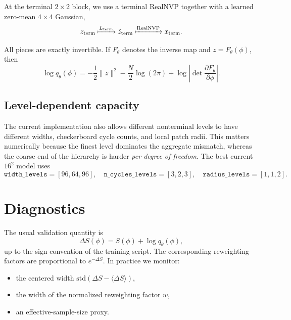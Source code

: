 \documentclass[aps,prd,preprint,nofootinbib,superscriptaddress,longbibliography]{revtex4-2}
\newcommand{\std}{\mathrm{std}}
\begin{document}
At the terminal $2\times2$ block, we use a terminal RealNVP together with a
learned zero-mean $4\times4$ Gaussian,
\begin{equation}
z_{\mathrm{term}}
\xmapsto{L_{\mathrm{term}}}
\tilde z_{\mathrm{term}}
\xmapsto{\mathrm{RealNVP}}
x_{\mathrm{term}}.
\end{equation}

All pieces are exactly invertible. If $F_\theta$ denotes the inverse map and
$z=F_\theta(\phi)$, then
\begin{equation}
\log q_\theta(\phi)
=
-\frac12 \|z\|^2
-\frac{N}{2}\log(2\pi)
+ \log\left|\det\frac{\partial F_\theta}{\partial\phi}\right|.
\end{equation}

\subsection{Level-dependent capacity}

The current implementation also allows different nonterminal levels to have
different widths, checkerboard cycle counts, and local patch radii. This matters
numerically because the finest level dominates the aggregate mismatch, whereas
the coarse end of the hierarchy is harder \emph{per degree of freedom}. The
best current $16^2$ model uses
\begin{equation}
\texttt{width\_levels}=[96,64,96],\quad
\texttt{n\_cycles\_levels}=[3,2,3],\quad
\texttt{radius\_levels}=[1,1,2].
\end{equation}

\section{Diagnostics}
\label{sec:diagnostics}

The usual validation quantity is
\begin{equation}
\Delta S(\phi)=S(\phi)+\log q_\theta(\phi),
\end{equation}
up to the sign convention of the training script. The corresponding reweighting
factors are proportional to $e^{-\Delta S}$. In practice we monitor:
\begin{itemize}
\item the centered width $\std(\Delta S-\langle\Delta S\rangle)$,
\item the width of the normalized reweighting factor $w$,
\item an effective-sample-size proxy.
\end{itemize}
\end{document}
